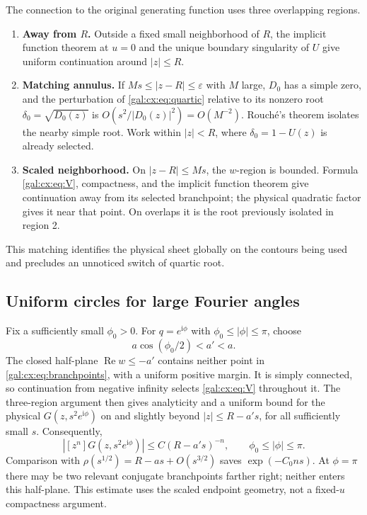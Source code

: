 \documentclass[11pt,letterpaper]{article}
\numberwithin{equation}{section}
\theoremstyle{definition}\newtheorem{definition}[theorem]{Definition}
\theoremstyle{remark}\newtheorem{remark}[theorem]{Remark}
\newcommand{\ii}{\mathrm i}
\newcommand{\eps}{\varepsilon}
\begin{document}
The connection to the original generating function uses three overlapping regions.
\begin{enumerate}[label=\arabic*.,leftmargin=*]
\item \textbf{Away from $R$.} Outside a fixed small neighborhood of $R$, the implicit function theorem at $u=0$ and the unique boundary singularity of $U$ give uniform continuation around $|z|\le R$.
\item \textbf{Matching annulus.} If $Ms\le|z-R|\le\eps$ with $M$ large, $D_0$ has a simple zero, and the perturbation of \eqref{gal:cx:eq:quartic} relative to its nonzero root $\delta_0=\sqrt{D_0(z)}$ is $O(s^2/|D_0(z)|^2)=O(M^{-2})$. Rouch\'e's theorem isolates the nearby simple root. Work within $|z|<R$, where $\delta_0=1-U(z)$ is already selected.
\item \textbf{Scaled neighborhood.} On $|z-R|\le Ms$, the $w$-region is bounded. Formula \eqref{gal:cx:eq:V}, compactness, and the implicit function theorem give continuation away from its selected branchpoint; the physical quadratic factor gives it near that point. On overlaps it is the root previously isolated in region 2.
\end{enumerate}
This matching identifies the physical sheet globally on the contours being used and precludes an unnoticed switch of quartic root.

\subsection{Uniform circles for large Fourier angles}
Fix a sufficiently small $\phi_0>0$. For $q=e^{\ii\phi}$ with $\phi_0\le|\phi|\le\pi$, choose
\[
a\cos(\phi_0/2)<a'<a.
\]
The closed half-plane $\operatorname{Re}w\le-a'$ contains neither point in \eqref{gal:cx:eq:branchpoints}, with a uniform positive margin. It is simply connected, so continuation from negative infinity selects \eqref{gal:cx:eq:V} throughout it. The three-region argument then gives analyticity and a uniform bound for the physical $G(z,s^2e^{\ii\phi})$ on and slightly beyond
$|z|\le R-a's$, for all sufficiently small $s$. Consequently,
\begin{equation}\label{gal:cx:eq:large-angle}
\left|[z^n]G(z,s^2e^{\ii\phi})\right|
\le C(R-a's)^{-n},\qquad \phi_0\le|\phi|\le\pi.
\end{equation}
Comparison with $\rho(s^{1/2})=R-as+O(s^{3/2})$ saves $\exp(-C_0ns)$. At $\phi=\pi$ there may be two relevant conjugate branchpoints farther right; neither enters this half-plane. This estimate uses the scaled endpoint geometry, not a fixed-$u$ compactness argument.
\end{document}

